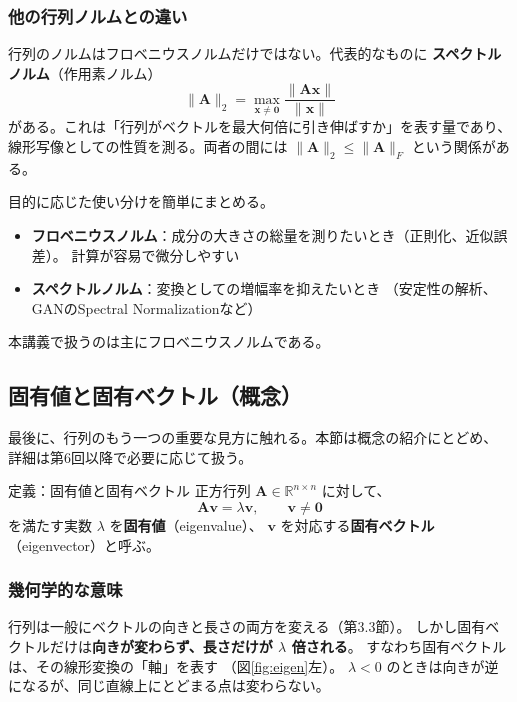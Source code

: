 \subsubsection{他の行列ノルムとの違い}

行列のノルムはフロベニウスノルムだけではない。代表的なものに
\textbf{スペクトルノルム}（作用素ノルム）
\begin{equation}
  \|\bm{A}\|_2 = \max_{\bm{x} \neq \bm{0}} \frac{\|\bm{A}\bm{x}\|}{\|\bm{x}\|}
\end{equation}
がある。これは「行列がベクトルを最大何倍に引き伸ばすか」を表す量であり、
線形写像としての性質を測る。両者の間には
$\|\bm{A}\|_2 \leq \|\bm{A}\|_F$ という関係がある。

目的に応じた使い分けを簡単にまとめる。
\begin{itemize}
  \item \textbf{フロベニウスノルム}：成分の大きさの総量を測りたいとき（正則化、近似誤差）。
    計算が容易で微分しやすい
  \item \textbf{スペクトルノルム}：変換としての増幅率を抑えたいとき
    （安定性の解析、GANのSpectral Normalizationなど）
\end{itemize}
本講義で扱うのは主にフロベニウスノルムである。


\subsection{固有値と固有ベクトル（概念）}

最後に、行列のもう一つの重要な見方に触れる。本節は概念の紹介にとどめ、
詳細は第6回以降で必要に応じて扱う。

\begin{itembox}[l]{定義：固有値と固有ベクトル}
正方行列 $\bm{A} \in \mathbb{R}^{n \times n}$ に対して、
\begin{equation}
  \bm{A}\bm{v} = \lambda \bm{v}, \qquad \bm{v} \neq \bm{0}
\end{equation}
を満たす実数 $\lambda$ を\textbf{固有値}（eigenvalue）、
$\bm{v}$ を対応する\textbf{固有ベクトル}（eigenvector）と呼ぶ。
\end{itembox}

\subsubsection{幾何学的な意味}

行列は一般にベクトルの向きと長さの両方を変える（第3.3節）。
しかし固有ベクトルだけは\textbf{向きが変わらず、長さだけが $\lambda$ 倍される}。
すなわち固有ベクトルは、その線形変換の「軸」を表す
（図\ref{fig:eigen}左）。
$\lambda < 0$ のときは向きが逆になるが、同じ直線上にとどまる点は変わらない。


